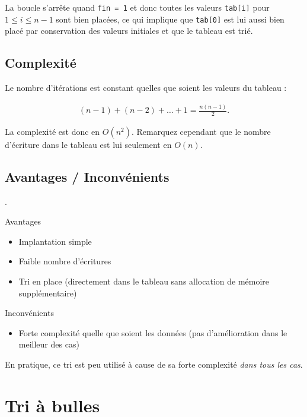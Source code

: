 \documentclass{../cours}
\begin{document}
La boucle s'arrête quand {\tt fin = 1} et donc toutes les valeurs {\tt tab[i]} pour $1 \leq i \leq n-1$ sont bien placées, ce qui implique que {\tt tab[0]} est lui aussi bien placé par conservation des valeurs initiales et que le tableau est trié. 

\subsection{Complexité}

Le nombre d'itérations est constant quelles que soient les valeurs du tableau :

\begin{align}
(n-1) + (n-2) +  \dots + 1 = \frac{n(n-1)}{2}.
\end{align}

La complexité est donc en $O(n^2)$. Remarquez cependant que le nombre d'écriture dans le tableau est lui seulement en $O(n)$.

\subsection{Avantages / Inconvénients}

.

\begin{minipage}[t]{0.49 \textwidth}
Avantages

\begin{itemize}
\item Implantation simple
\item Faible nombre d'écritures
\item Tri en place (directement dans le tableau sans allocation de mémoire supplémentaire)
\end{itemize}

\end{minipage}
\begin{minipage}[t]{0.49 \textwidth}
Inconvénients

\begin{itemize}
\item Forte complexité quelle que soient les données (pas d'amélioration dans le meilleur des cas)
\end{itemize}

\end{minipage}

En pratique, ce tri est peu utilisé à cause de sa forte complexité \textit{dans tous les cas}.


\section{Tri à bulles}
\end{document}
